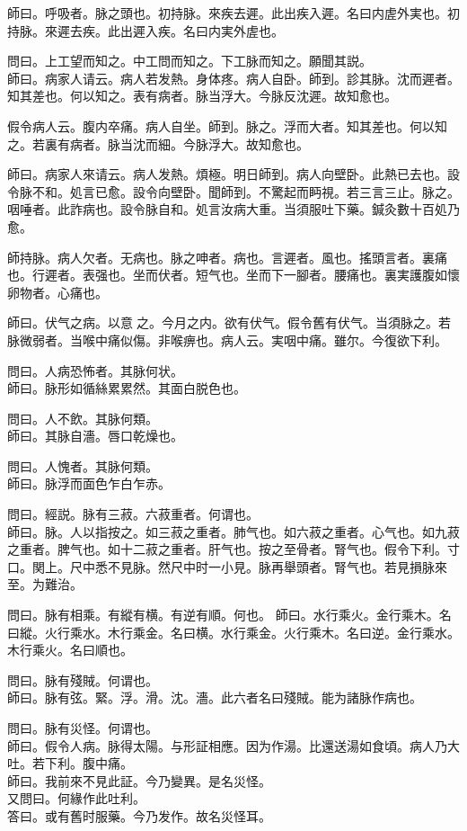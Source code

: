 師曰。呼吸者。脉之頭也。初持脉。來疾去遲。此出疾入遲。名曰内虗外実也。初持脉。來遲去疾。此出遲入疾。名曰内実外虗也。

問曰。上工望而知之。中工問而知之。下工脉而知之。願聞其説。\\
師曰。病家人请云。病人若发熱。身体疼。病人自卧。師到。診其脉。沈而遲者。知其差也。何以知之。表有病者。脉当浮大。今脉反沈遲。故知愈也。

假令病人云。腹内卒痛。病人自坐。師到。脉之。浮而大者。知其差也。何以知之。若裏有病者。脉当沈而細。今脉浮大。故知愈也。

師曰。病家人來请云。病人发熱。煩極。明日師到。病人向壁卧。此熱已去也。設令脉不和。処言已愈。設令向壁卧。聞師到。不驚起而眄視。若三言三止。脉之。咽唾者。此詐病也。設令脉自和。処言汝病大重。当須服吐下藥。鍼灸數十百処乃愈。

師持脉。病人欠者。无病也。脉之呻者。病也。言遲者。風也。搖頭言者。裏痛也。行遲者。表强也。坐而伏者。短气也。坐而下一腳者。腰痛也。裏実護腹如懷卵物者。心痛也。

師曰。伏气之病。以意{\sungtpii 𠊱}之。今月之内。欲有伏气。假令舊有伏气。当須脉之。若脉微弱者。当喉中痛似傷。非喉痹也。病人云。実咽中痛。雖尔。今復欲下利。

問曰。人病恐怖者。其脉何状。\\
師曰。脉形如循絲累累然。其面白脱色也。

問曰。人不飲。其脉何類。\\
師曰。其脉自濇。唇口乾燥也。

問曰。人愧者。其脉何類。\\
師曰。脉浮而面色乍白乍赤。

問曰。經説。脉有三菽。六菽重者。何谓也。\\
師曰。脉。人以指按之。如三菽之重者。肺气也。如六菽之重者。心气也。如九菽之重者。脾气也。如十二菽之重者。肝气也。按之至骨者。腎气也。假令下利。寸口。関上。尺中悉不見脉。然尺中时一小見。脉再舉頭者。腎气也。若見損脉來至。为難治。

問曰。脉有相乘。有縱有横。有逆有順。何也。
師曰。水行乘火。金行乘木。名曰縱。火行乘水。木行乘金。名曰横。水行乘金。火行乘木。名曰逆。金行乘水。木行乘火。名曰順也。

問曰。脉有殘賊。何谓也。\\
師曰。脉有弦。緊。浮。滑。沈。濇。此六者名曰殘賊。能为諸脉作病也。

問曰。脉有災怪。何谓也。\\
師曰。假令人病。脉得太陽。与形証相應。因为作湯。比還送湯如食頃。病人乃大吐。若下利。腹中痛。\\
師曰。我前來不見此証。今乃變異。是名災怪。\\
又問曰。何緣作此吐利。\\
答曰。或有舊时服藥。今乃发作。故名災怪耳。

